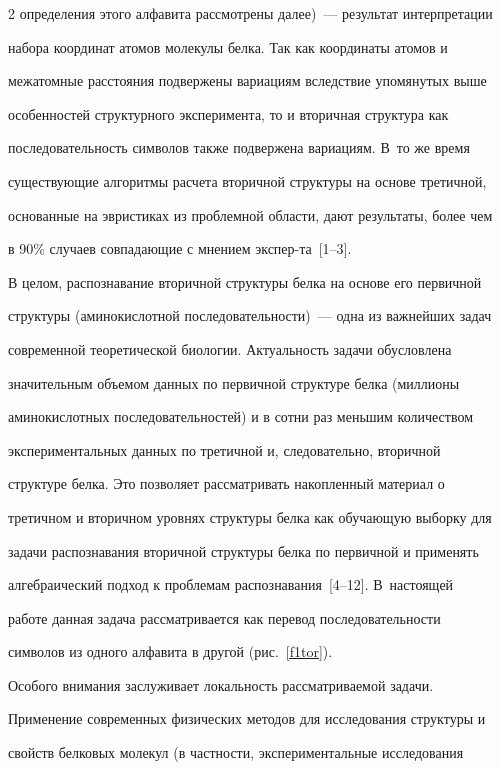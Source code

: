 \begin{multicols}{2}
определения этого алфавита  рассмотрены далее)~--- результат интерпретации 

набора координат атомов молекулы белка. Так как координаты атомов и 

межатомные расстояния подвержены вариациям вследствие упомянутых выше 

особен\-ностей структурного эксперимента, то и вторичная структура как 

последовательность символов также подвержена вариациям. В~то же время 

существующие алгоритмы расчета вторичной структуры на основе третичной, 

основанные на эвристиках из проблемной области, дают результаты, более чем 

в 90\% случаев совпадающие с мнением экс\-пер-\linebreak та~[1--3]. 

    

В целом, распознавание вторичной структуры белка на основе его первичной 

структуры (амино\-кислотной последовательности)~--- одна из важней\-ших задач  

современной теоретической биологии. Актуальность задачи обусловлена 

значительным объемом данных по первичной структуре белка (миллионы 

аминокислотных последовательностей) и в сотни раз меньшим количеством 

экспериментальных данных по третичной и, следовательно, вторичной 

структуре белка. Это позволяет рассматривать накопленный материал о 

третичном и вторичном уровнях структуры белка как обуча\-ющую выборку для 

задачи распознавания вторичной структуры белка по первичной и применять 

алгебраический подход к проблемам распознавания~[4--12].  В~настоящей 

работе данная задача рассматривается как перевод последовательности 

символов из одного алфавита в другой (рис.~\ref{f1tor}).



     Особого внимания заслуживает локальность рассматриваемой задачи. 

Применение современных физических методов для исследования структуры и 

свойств белковых молекул (в частности, экспериментальные исследования 


\end{multicols}
